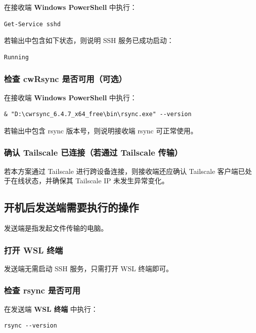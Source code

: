 \documentclass[UTF8]{ctexart}
\begin{document}
在接收端 \textbf{Windows PowerShell} 中执行：

\begin{lstlisting}
Get-Service sshd
\end{lstlisting}

若输出中包含如下状态，则说明 SSH 服务已成功启动：

\begin{lstlisting}
Running
\end{lstlisting}

\subsubsection{ 检查 cwRsync 是否可用（可选）}

在接收端 \textbf{Windows PowerShell} 中执行：

\begin{lstlisting}
& "D:\cwrsync_6.4.7_x64_free\bin\rsync.exe" --version
\end{lstlisting}

若输出中包含 rsync 版本号，则说明接收端 rsync 可正常使用。

\subsubsection{ 确认 Tailscale 已连接（若通过 Tailscale 传输）}

若本方案通过 Tailscale 进行跨设备连接，则接收端还应确认 Tailscale 客户端已处于在线状态，并确保其 Tailscale IP 未发生异常变化。

\subsection{开机后发送端需要执行的操作}

发送端是指发起文件传输的电脑。

\subsubsection{打开 WSL 终端}

发送端无需启动 SSH 服务，只需打开 WSL 终端即可。

\subsubsection{检查 rsync 是否可用}

在发送端 \textbf{WSL 终端} 中执行：

\begin{lstlisting}
rsync --version
\end{lstlisting}
\end{document}
